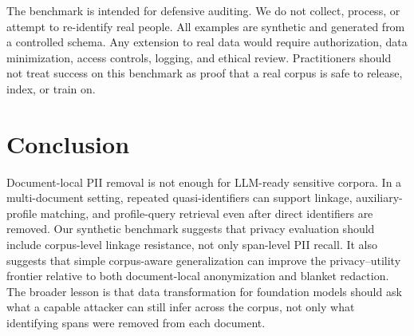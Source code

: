 \documentclass{article}
\begin{document}
The benchmark is intended for defensive auditing.
We do not collect, process, or attempt to re-identify real people.
All examples are synthetic and generated from a controlled schema.
Any extension to real data would require authorization, data minimization, access controls, logging, and ethical review.
Practitioners should not treat success on this benchmark as proof that a real corpus is safe to release, index, or train on.

\section{Conclusion}

Document-local PII removal is not enough for LLM-ready sensitive corpora.
In a multi-document setting, repeated quasi-identifiers can support linkage, auxiliary-profile matching, and profile-query retrieval even after direct identifiers are removed.
Our synthetic benchmark suggests that privacy evaluation should include corpus-level linkage resistance, not only span-level PII recall.
It also suggests that simple corpus-aware generalization can improve the privacy--utility frontier relative to both document-local anonymization and blanket redaction.
The broader lesson is that data transformation for foundation models should ask what a capable attacker can still infer across the corpus, not only what identifying spans were removed from each document.
\end{document}
